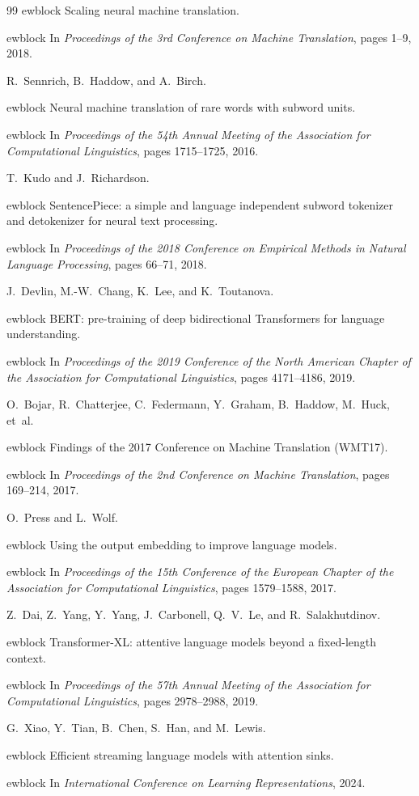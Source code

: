 \documentclass[10pt]{article}
\begin{document}
\begin{thebibliography}{99}
ewblock Scaling neural machine translation.

ewblock In \emph{Proceedings of the 3rd Conference on Machine Translation}, pages 1--9, 2018.

R.~Sennrich, B.~Haddow, and A.~Birch.

ewblock Neural machine translation of rare words with subword units.

ewblock In \emph{Proceedings of the 54th Annual Meeting of the Association for Computational Linguistics}, pages 1715--1725, 2016.

T.~Kudo and J.~Richardson.

ewblock SentencePiece: a simple and language independent subword tokenizer and detokenizer for neural text processing.

ewblock In \emph{Proceedings of the 2018 Conference on Empirical Methods in Natural Language Processing}, pages 66--71, 2018.

J.~Devlin, M.-W.~Chang, K.~Lee, and K.~Toutanova.

ewblock BERT: pre-training of deep bidirectional Transformers for language understanding.

ewblock In \emph{Proceedings of the 2019 Conference of the North American Chapter of the Association for Computational Linguistics}, pages 4171--4186, 2019.

O.~Bojar, R.~Chatterjee, C.~Federmann, Y.~Graham, B.~Haddow, M.~Huck, et~al.

ewblock Findings of the 2017 Conference on Machine Translation (WMT17).

ewblock In \emph{Proceedings of the 2nd Conference on Machine Translation}, pages 169--214, 2017.

O.~Press and L.~Wolf.

ewblock Using the output embedding to improve language models.

ewblock In \emph{Proceedings of the 15th Conference of the European Chapter of the Association for Computational Linguistics}, pages 1579--1588, 2017.

Z.~Dai, Z.~Yang, Y.~Yang, J.~Carbonell, Q.~V.~Le, and R.~Salakhutdinov.

ewblock Transformer-XL: attentive language models beyond a fixed-length context.

ewblock In \emph{Proceedings of the 57th Annual Meeting of the Association for Computational Linguistics}, pages 2978--2988, 2019.

G.~Xiao, Y.~Tian, B.~Chen, S.~Han, and M.~Lewis.

ewblock Efficient streaming language models with attention sinks.

ewblock In \emph{International Conference on Learning Representations}, 2024.

\end{thebibliography}
\end{document}
